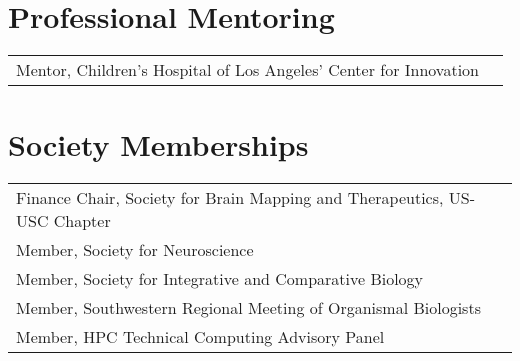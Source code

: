 \documentclass[10pt,a4paper]{article}
\begin{document}
\vspace*{5mm}\section*{Professional Mentoring}
\vspace*{1mm}\noindent\begin{tabularx}{17cm}{X r}
Mentor, Children's Hospital of Los Angeles' Center for Innovation\\ %
\end{tabularx}

\vspace*{2mm}\section*{Society Memberships}
\vspace*{1mm}\noindent\begin{tabularx}{17cm}{X r}
  Finance Chair, Society for Brain Mapping and Therapeutics, US-USC Chapter \\ %
  Member, Society for Neuroscience \\
  Member, Society for Integrative and Comparative Biology \\
  Member, Southwestern Regional Meeting of Organismal Biologists \\
  Member, HPC Technical Computing Advisory Panel \\ %
\end{tabularx}

\end{document}
